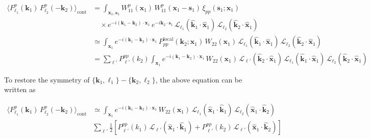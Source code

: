 \documentclass[a4paper,11pt]{article}
\begin{document}
\begin{align}
\langle
F_{\ell_1}^{p}(\boldsymbol{k}_1)\,
F_{\ell_2}^{p}(-\boldsymbol{k}_2)
\rangle_{\mathrm{cont}}
&=
\int_{\boldsymbol{x}_1, \boldsymbol{s}_1}
W_{11}^{p}(\boldsymbol{x}_1)\,
W_{11}^{p}(\boldsymbol{x}_1-\boldsymbol{s}_1)\,
\xi_{pp}(\boldsymbol{s}_1;\boldsymbol{x}_1)
\nonumber\\
&\quad\times
e^{-i(\boldsymbol{k}_1-\boldsymbol{k}_2)\cdot \boldsymbol{x}_1}\,
e^{-i\boldsymbol{k}_2\cdot \boldsymbol{s}_1}\,
\mathcal{L}_{\ell_1}\!(\hat{\boldsymbol{k}}_1\!\cdot\!\hat{\boldsymbol{x}}_1)\,
\mathcal{L}_{\ell_2}\!(\hat{\boldsymbol{k}}_2\!\cdot\!\hat{\boldsymbol{x}}_1)
\nonumber\\
&\simeq
\int_{\boldsymbol{x}_1}
e^{-i(\boldsymbol{k}_1-\boldsymbol{k}_2)\cdot \boldsymbol{x}_1}\,
P_{pp}^{\mathrm{local}}(\boldsymbol{k}_2;\boldsymbol{x}_1)\,
W_{22}(\boldsymbol{x}_1)\,
\mathcal{L}_{\ell_1}\!(\hat{\boldsymbol{k}}_1\!\cdot\!\hat{\boldsymbol{x}}_1)\,
\mathcal{L}_{\ell_2}\!(\hat{\boldsymbol{k}}_2\!\cdot\!\hat{\boldsymbol{x}}_1)
\nonumber\\
&=\sum_{\ell'}P^{pp}_{\ell'}(k_2)\int_{\boldsymbol{x}_1}
e^{-i(\boldsymbol{k}_1-\boldsymbol{k}_2)\cdot \boldsymbol{x}_1}\,
W_{22}(\boldsymbol{x}_1)\,
\mathcal{L}_{\ell'}(\hat{\boldsymbol{k}}_2\!\cdot\!\hat{\boldsymbol{x}}_1)\,
\mathcal{L}_{\ell_1}\!(\hat{\boldsymbol{k}}_1\!\cdot\!\hat{\boldsymbol{x}}_1)\,
\mathcal{L}_{\ell_2}\!(\hat{\boldsymbol{k}}_2\!\cdot\!\hat{\boldsymbol{x}}_1)
\end{align}

To restore the symmetry of $\{\boldsymbol{k}_1, \ell_1\}-\{\boldsymbol{k}_2,\ell_2\}$, the above equation can be written as

\begin{align}
\langle
F_{\ell_1}^{p}(\boldsymbol{k}_1)\,
F_{\ell_2}^{p}(-\boldsymbol{k}_2)
\rangle_{\mathrm{cont}}
&\simeq
\int_{\boldsymbol{x}_1}
e^{-i(\boldsymbol{k}_1-\boldsymbol{k}_2)\cdot \boldsymbol{x}_1}\,
W_{22}(\boldsymbol{x}_1)\,
\mathcal{L}_{\ell_1}\!(\hat{\boldsymbol{x}}_1\!\cdot\!\hat{\boldsymbol{k}}_1)\,
\mathcal{L}_{\ell_2}\!(\hat{\boldsymbol{x}}_1\!\cdot\!\hat{\boldsymbol{k}}_2)\,
\nonumber\\
&\sum_{\ell'}
\frac{1}{2}
\left[
P^{pp}_{\ell'}(k_1)\,
\mathcal{L}_{\ell'}\!(\hat{\boldsymbol{x}}_1\!\cdot\!\hat{\boldsymbol{k}}_1)
+
P^{pp}_{\ell'}(k_2)\,
\mathcal{L}_{\ell'}\!(\hat{\boldsymbol{x}}_1\!\cdot\!\hat{\boldsymbol{k}}_2)
\right]
\end{align}
\end{document}
